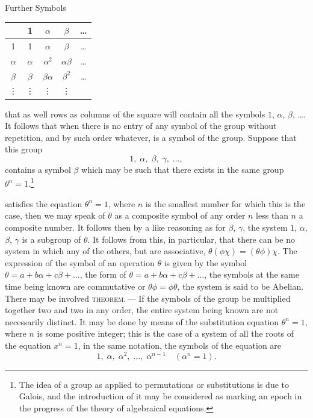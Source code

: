 \documentclass[11pt,a4paper]{book}
\begin{document}
\medskip

\begin{center}
Further Symbols\\[2pt]
\begin{tabular}{c|cccc}
 & 1 & $\alpha$ & $\beta$ & \ldots \\\hline
1 & 1 & $\alpha$ & $\beta$ & \ldots \\
$\alpha$ & $\alpha$ & $\alpha^2$ & $\alpha\beta$ & \ldots \\
$\beta$ & $\beta$ & $\beta\alpha$ & $\beta^2$ & \ldots \\
\vdots & \vdots & \vdots & \vdots &
\end{tabular}
\end{center}

\medskip

that as well rows as columns of the square will contain all the symbols
$1$, $\alpha$, $\beta$, \ldots. It follows that when there is no entry of any symbol of the group
without repetition, and by such order whatever, is a symbol of the group. Suppose
that this group
\[
1,\;\alpha,\;\beta,\;\gamma,\;\ldots,
\]
contains a symbol $\beta$ which may be such that there exists in the same group
$\theta^n = 1.$\footnote{The idea of a group as applied to permutations or substitutions is due to Galois, and the introduction of it may be considered as marking an epoch in the progress of the theory of algebraical equations.}

\medskip

\noindent satisfies the equation $\theta^n=1$, where $n$ is the smallest number for which this is
the case, then we may speak of $\theta$ as a composite symbol of any order $n$ less than $n$ a composite
number. It follows then by a like reasoning as for $\beta$, $\gamma$, the system $1$, $\alpha$, $\beta$, $\gamma$ is
a subgroup of $\theta$. It follows from this, in particular, that there can be no system
in which any of the others, but are associative, $\theta(\phi\chi) = (\theta\phi)\chi$. The expression of
the symbol of an operation $\theta$ is given by the symbol $\theta = a + b\alpha + c\beta + \ldots$, the
form of $\theta = a + b\alpha + c\beta + \ldots$, the symbols at the same time being known are commutative or
$\theta\phi = \phi\theta$, the system is said to be Abelian. There may be involved \textsc{theorem.\,---} If the symbols of the group be multiplied together two and two in any
order, the entire system being known are not necessarily distinct. It may be done by means
of the substitution equation $\theta^n = 1$, where $n$ is some positive integer; this is the
case of a system of all the roots of the equation $x^n = 1$, in the same notation, the
symbols of the equation are
\[
1,\;\alpha,\;\alpha^2,\;\ldots,\;\alpha^{n-1}\quad(\alpha^n=1).
\]
\end{document}
